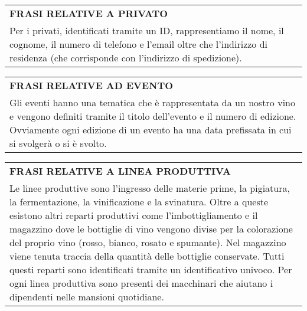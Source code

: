 \begin{center}
	\vspace{0.5cm}

	\begin{tabular}{P{16cm}}
		\toprule
		 \textbf {\large {FRASI RELATIVE A PRIVATO}}                                                                                                                  \\
		Per i privati, identificati tramite un ID, rappresentiamo il nome, il cognome, il numero di telefono e l'email oltre che l'indirizzo di residenza (che corrisponde con l'indirizzo di spedizione). \\
		\bottomrule
	\end{tabular}

	\vspace{0.5cm}

	\begin{tabular}{P{16cm}}
		\toprule
		 \textbf {\large {FRASI RELATIVE AD EVENTO}}                                                                                                                                    \\
		Gli eventi hanno una tematica che è rappresentata da un nostro vino e vengono definiti tramite il titolo dell'evento e il numero di edizione. Ovviamente ogni edizione di un evento ha una data prefissata in cui si svolgerà o si è svolto. \\
		\bottomrule
	\end{tabular}

	\vspace{0.5cm}

	\begin{tabular}{P{16cm}}
		\toprule
		 \textbf {\large {FRASI RELATIVE A LINEA PRODUTTIVA}}                                                                                                                                                                                                                                                                                                                                                                                                                                                                                                         \\
		Le linee produttive sono l'ingresso delle materie prime, la pigiatura, la fermentazione, la vinificazione e la svinatura. Oltre a queste esistono altri reparti produttivi come l'imbottigliamento e il magazzino dove le bottiglie di vino vengono divise per la colorazione del proprio vino (rosso, bianco, rosato e spumante). Nel magazzino viene tenuta traccia della quantità delle bottiglie conservate. Tutti questi reparti sono identificati tramite un identificativo univoco. Per ogni linea produttiva sono presenti dei macchinari che aiutano i dipendenti nelle mansioni quotidiane. \\
		\bottomrule
	\end{tabular}


\end{center}
